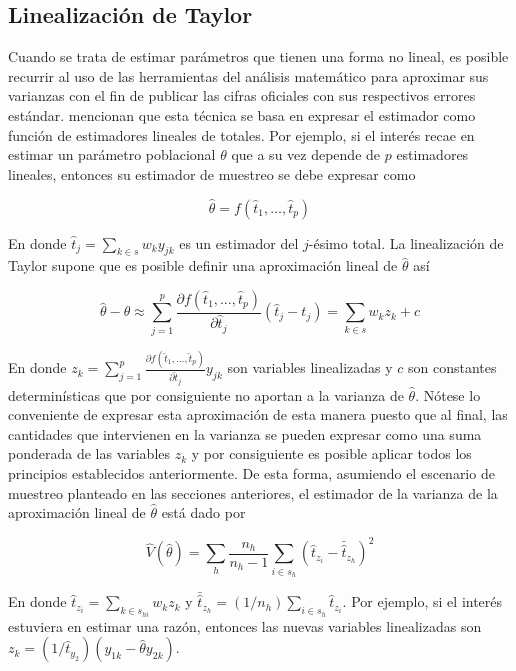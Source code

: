 \hypertarget{linealizacion-de-taylor}{%
\subsection{Linealización de Taylor}\label{linealizacion-de-taylor}}

Cuando se trata de estimar parámetros que tienen una forma no lineal, es posible recurrir al uso de las herramientas del análisis matemático para aproximar sus varianzas con el fin de publicar las cifras oficiales con sus respectivos errores estándar. \citet{Valliant_Dever_Kreuter_2013} mencionan que esta técnica se basa en expresar el estimador como función de estimadores lineales de totales. Por ejemplo, si el interés recae en estimar un parámetro poblacional \(\theta\) que a su vez depende de \(p\) estimadores lineales, entonces su estimador de muestreo se debe expresar como

\[
\hat{\theta}=f(\hat{t}_1, \ldots, \hat{t}_p)
\]

En donde \(\hat{t}_j=\sum_{k\in s}w_k y_{jk}\) es un estimador del \(j\)-ésimo total. La linealización de Taylor supone que es posible definir una aproximación lineal de \(\hat{\theta}\) así

\[
\hat{\theta} - \theta 
\approx \sum_{j=1}^p \frac{\partial f(\hat{t}_1, \ldots, \hat{t}_p) }{\partial \hat{t}_j}(\hat{t}_j - t_j)
= \sum_{k\in s} w_k z_k + c
\]

En donde \(z_k= \sum_{j=1}^p \frac{\partial f(\hat{t}_1, \ldots, \hat{t}_p) }{\partial \hat{t}_j} y_{jk}\) son variables linealizadas y \(c\) son constantes determinísticas que por consiguiente no aportan a la varianza de \(\hat{\theta}\). Nótese lo conveniente de expresar esta aproximación de esta manera puesto que al final, las cantidades que intervienen en la varianza se pueden expresar como una suma ponderada de las variables \(z_k\) y por consiguiente es posible aplicar todos los principios establecidos anteriormente. De esta forma, asumiendo el escenario de muestreo planteado en las secciones anteriores, el estimador de la varianza de la aproximación lineal de \(\hat{\theta}\) está dado por

\[
\hat{V}(\hat{\theta}) = 
\sum_h\frac{n_h}{n_h-1}\sum_{i\in s_h}\left(\hat{t}_{z_i}-\bar{\hat{t}}_{z_h}\right)^2
\]

En donde \(\hat{t}_{z_i} = \sum_{k \in s_{hi}} w_k z_k\) y \(\bar{\hat{t}}_{z_h}=(1/n_h)\sum_{i \in s_h}\hat{t}_{z_i}\). Por ejemplo, si el interés estuviera en estimar una razón, entonces las nuevas variables linealizadas son \(z_k=(1/\hat{t}_{y_2})(y_{1k}-\hat{\theta}y_{2k})\).

